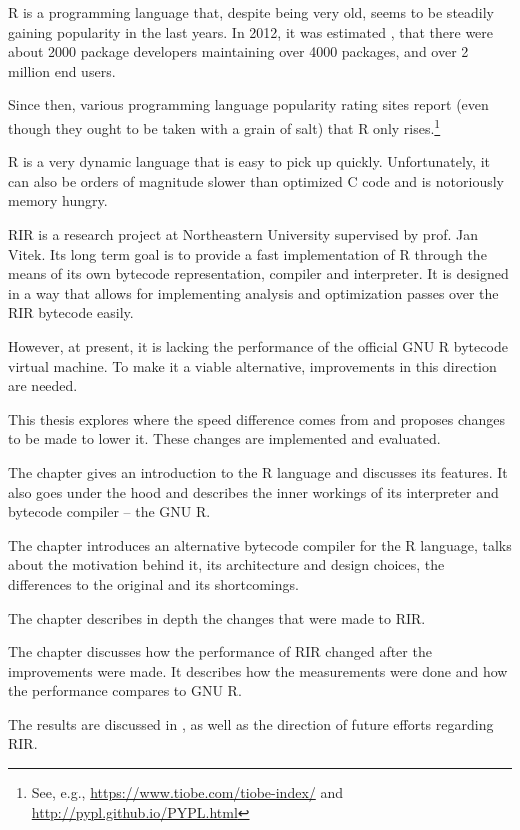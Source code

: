 R is a programming language that, despite being very old, seems to be steadily gaining popularity in the last years. In 2012, it was estimated \autocite{design}, that there were about 2000 package developers maintaining over 4000 packages, and over 2 million end users.

Since then, various programming language popularity rating sites report (even though they ought to be taken with a grain of salt) that R only rises.\footnote{See, e.g., \url{https://www.tiobe.com/tiobe-index/} and \url{http://pypl.github.io/PYPL.html}}

R is a very dynamic language that is easy to pick up quickly. Unfortunately, it can also be orders of magnitude slower than optimized C code and is notoriously memory hungry.

RIR is a research project at Northeastern University supervised by prof. Jan Vitek. Its long term goal is to provide a fast implementation of R through the means of its own bytecode representation, compiler and interpreter. It is designed in a way that allows for implementing analysis and optimization passes over the RIR bytecode easily.

However, at present, it is lacking the performance of the official GNU R bytecode virtual machine. To make it a viable alternative, improvements in this direction are needed.

This thesis explores where the speed difference comes from and proposes changes to be made to lower it. These changes are implemented and evaluated.

The chapter \emph{} gives an introduction to the R language and discusses its features. It also goes under the hood and describes the inner workings of its interpreter and bytecode compiler -- the GNU R.

The chapter \emph{} introduces an alternative bytecode compiler for the R language, talks about the motivation behind it, its architecture and design choices, the differences to the original and its shortcomings.

The chapter \emph{} describes in depth the changes that were made to RIR.

The chapter \emph{} discusses how the performance of RIR changed after the improvements were made. It describes how the measurements were done and how the performance compares to GNU R.

The results are discussed in \emph{}, as well as the direction of future efforts regarding RIR.
